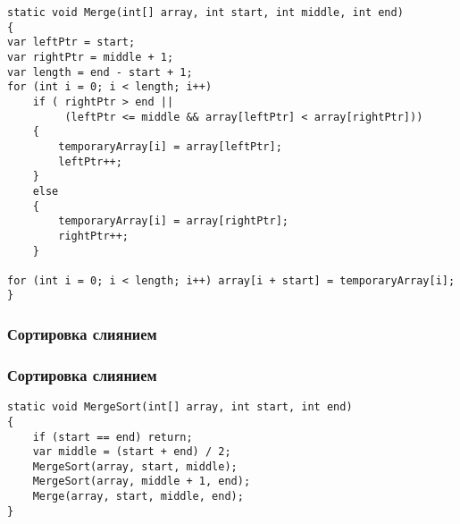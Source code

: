 \documentclass[24pt,pdf,hyperref={unicode},aspectratio=169]{beamer}
\begin{document}
\begin{frame}[fragile]
\begin{small}
\begin{verbatim}
static void Merge(int[] array, int start, int middle, int end)
{
var leftPtr = start;
var rightPtr = middle + 1;
var length = end - start + 1;
for (int i = 0; i < length; i++)
    if ( rightPtr > end || 
         (leftPtr <= middle && array[leftPtr] < array[rightPtr]))
    {
        temporaryArray[i] = array[leftPtr];
        leftPtr++;
    }
    else 
    {
        temporaryArray[i] = array[rightPtr];
        rightPtr++;
    }

for (int i = 0; i < length; i++) array[i + start] = temporaryArray[i];
}
\end{verbatim}
\end{small}
\end{frame}

\begin{frame}\frametitle{Сортировка слиянием}
\begin{center}
\end{center}
\end{frame}


\begin{frame}[fragile]\frametitle{Сортировка слиянием}
\begin{verbatim}
static void MergeSort(int[] array, int start, int end)
{
    if (start == end) return;
    var middle = (start + end) / 2;
    MergeSort(array, start, middle);
    MergeSort(array, middle + 1, end);
    Merge(array, start, middle, end);
}
\end{verbatim}
\end{frame}
\end{document}
